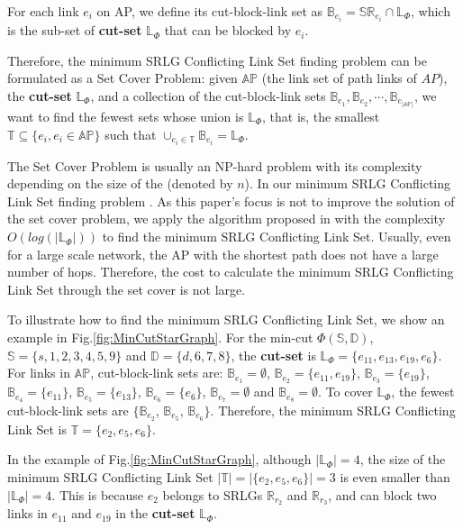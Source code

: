 For each link $e_i$ on AP, we define its cut-block-link set as ${\mathbb{B}_{{e_i}}} = \mathbb{SR}_{{e_i}} \cap \mathbb{L}_{\Phi}$, which is the sub-set of \textbf{cut-set} $\mathbb{L}_{\Phi}$ that can be blocked by $e_i$.

Therefore, the minimum SRLG Conflicting Link Set finding problem can be formulated as a Set Cover Problem: given $\mathbb{AP}$ (the link set of path links of $AP$), the \textbf{cut-set} $\mathbb{L}_{\Phi}$,  and a collection of the cut-block-link sets ${\mathbb{B}_{{e_1}}},{\mathbb{B}_{{e_2}}}, \cdots ,{\mathbb{B}_{{e_{|\mathbb{AP}|}}}}$, we want to find the fewest sets whose union is $\mathbb{L}_{\Phi}$, that is, the smallest $\mathbb{T} \subseteq \{e_i, e_i\in \mathbb{AP}\}$ such that ${ \cup_{e_i \in \mathbb{T}}}{\mathbb{B}_{e_i}} = \mathbb{L}_{\Phi}$.

The Set Cover Problem is usually an NP-hard problem with its complexity depending on the size of the  (denoted by $n$). In our minimum SRLG Conflicting Link Set finding problem . As this paper's focus is not to improve the solution of the set cover problem, we apply the algorithm proposed in \cite{chvatal1979greedy} with the complexity $O(log(|\mathbb{L}_{\Phi}|))$  to find the minimum SRLG Conflicting Link Set. Usually, even for a large scale network, the  AP with the shortest path does not have a large number of hops. Therefore, the cost to calculate the minimum SRLG Conflicting Link Set through the set cover is not large.

To illustrate how to find the minimum SRLG Conflicting Link Set, we show an example in Fig.\ref{fig:MinCutStarGraph}. For the min-cut $\Phi(\mathbb{S},\mathbb{D})$, $\mathbb{S}=\{s, 1, 2, 3, 4, 5, 9\}$ and $\mathbb{D}=\{d, 6, 7, 8\}$, the \textbf{cut-set} is $\mathbb{L}_{\Phi}=\{e_{11},e_{13},e_{19},e_{6}\}$. For links in $\mathbb{AP}$,  cut-block-link sets are: $\mathbb{B}_{e_1}=\emptyset$, $\mathbb{B}_{e_2}=\{e_{11},e_{19}\}$, $\mathbb{B}_{e_3}=\{e_{19}\}$, $\mathbb{B}_{e_4}=\{e_{11}\}$, $\mathbb{B}_{e_5}=\{e_{13}\}$, $\mathbb{B}_{e_6}=\{e_6\}$, $\mathbb{B}_{e_7}=\emptyset$ and $\mathbb{B}_{e_8}=\emptyset$. To cover $\mathbb{L}_{\Phi}$, the fewest cut-block-link sets are $\{\mathbb{B}_{e_2}$, $\mathbb{B}_{e_5}$, $\mathbb{B}_{e_6}\}$. Therefore, the minimum SRLG Conflicting Link Set is $\mathbb{T}=\{e_2, e_5, e_6 \}$.

In the example of Fig.\ref{fig:MinCutStarGraph}, although $|\mathbb{L}_{\Phi}|=4$, the size of  the minimum SRLG Conflicting Link Set $|\mathbb{T}|=|\{e_2, e_5, e_6 \}|=3$ is even smaller than $|\mathbb{L}_{\Phi}|=4$. This is because $e_2$ belongs to   SRLGs $\mathbb{R}_{r_2}$ and $\mathbb{R}_{r_3}$, and can block two links in $e_{11}$ and  $e_{19}$ in the \textbf{cut-set} $\mathbb{L}_{\Phi}$.

